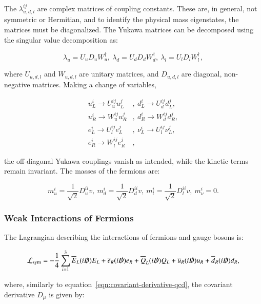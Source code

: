  The $\lambda_{u,d,l}^{ij}$ are complex matrices of coupling constants. These are, in general, not symmetric or Hermitian, and to identify the physical mass eigenstates, the matrices must be diagonalized. The Yukawa matrices can be decomposed using the singular value decomposition as:

\begin{equation}
	\lambda_u = U_u D_u W_u^{\dagger},\ \lambda_d = U_d D_d W_d^{\dagger},\ \lambda_l = U_l D_l W_l^{\dagger},
\end{equation}
 
where $U_{u,d,l}$ and $W_{u,d,l}$ are unitary matrices, and $D_{u,d,l}$ are diagonal, non-negative matrices. Making a change of variables,

\begin{align}\label{eqn:yukawa-diagonalization}
	u_L^i\rightarrow U_{u}^{ij}u_L^j&,\ d_L^i\rightarrow U_d^{ij}d_L^j, \\
	u_R^i\rightarrow W_{u}^{ij}u_R^j&,\ d_R^i\rightarrow W_d^{ij}d_R^j, \\
	e_L^i\rightarrow U_l^{ij}e_L^j&,\ \nu_L^i\rightarrow U_l^{ij}\nu_L^j, \\
	e_R^i\rightarrow W_l^{ij}e_R^j&,
\end{align}

the off-diagonal Yukawa couplings vanish as intended, while the kinetic terms remain invariant. The masses of the fermions are:

\begin{equation}
	m_u^i = \frac{1}{\sqrt{2}} D_u^{ii}v,\ m_d^i = \frac{1}{\sqrt{2}} D_d^{ii}v,\ m_l^i = \frac{1}{\sqrt{2}} D_l^{ii}v,\ m_{\nu}^i = 0.
\end{equation}


\subsubsection{Weak Interactions of Fermions}
The Lagrangian describing the interactions of fermions and gauge bosons is:

\begin{equation}\label{eqn:electroweak-lagrangian}
	\mathcal{L}_{\mathrm{sym}} =  -\frac{1}{4} \sum_{i=1}^3  \overline{E}_L (i\slashed{D}) E_L + \overline{e}_R(i\slashed{D})e_R + \overline{Q}_L(i\slashed{D})Q_L + \overline{u}_R(i\slashed{D})u_R+\overline{d}_R(i\slashed{D})d_R,
\end{equation}

where, similarly to equation~\ref{eqn:covariant-derivative-qcd}, the covariant derivative $D_{\mu}$ is given by:

